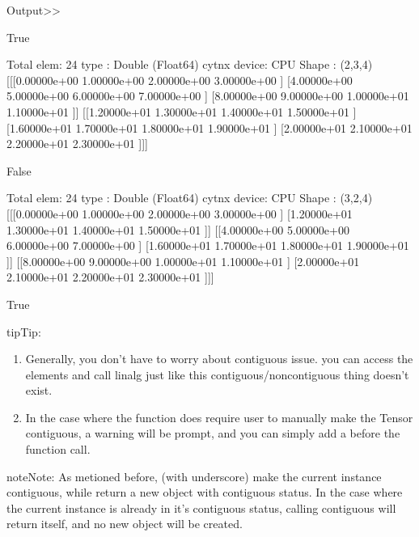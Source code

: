 \documentclass[letterpaper,10pt,english]{sphinxmanual}
\begin{document}
Output\textgreater{}\textgreater{}

\begin{sphinxVerbatim}[commandchars=\\\{\}]
True

Total elem: 24
type  : Double (Float64)
cytnx device: CPU
Shape : (2,3,4)
[[[0.00000e+00 1.00000e+00 2.00000e+00 3.00000e+00 ]
  [4.00000e+00 5.00000e+00 6.00000e+00 7.00000e+00 ]
  [8.00000e+00 9.00000e+00 1.00000e+01 1.10000e+01 ]]
 [[1.20000e+01 1.30000e+01 1.40000e+01 1.50000e+01 ]
  [1.60000e+01 1.70000e+01 1.80000e+01 1.90000e+01 ]
  [2.00000e+01 2.10000e+01 2.20000e+01 2.30000e+01 ]]]

False

Total elem: 24
type  : Double (Float64)
cytnx device: CPU
Shape : (3,2,4)
[[[0.00000e+00 1.00000e+00 2.00000e+00 3.00000e+00 ]
  [1.20000e+01 1.30000e+01 1.40000e+01 1.50000e+01 ]]
 [[4.00000e+00 5.00000e+00 6.00000e+00 7.00000e+00 ]
  [1.60000e+01 1.70000e+01 1.80000e+01 1.90000e+01 ]]
 [[8.00000e+00 9.00000e+00 1.00000e+01 1.10000e+01 ]
  [2.00000e+01 2.10000e+01 2.20000e+01 2.30000e+01 ]]]

True
\end{sphinxVerbatim}

\begin{sphinxadmonition}{tip}{Tip:}\begin{enumerate}
%
\item {} 
Generally, you don’t have to worry about contiguous issue. you can access the elements and call linalg just like this contiguous/non\sphinxhyphen{}contiguous thing doesn’t exist.

\item {} 
In the case where the function does require user to manually make the Tensor contiguous, a warning will be prompt, and you can simply add a  before the function call.

\end{enumerate}
\end{sphinxadmonition}

\begin{sphinxadmonition}{note}{Note:}
As metioned before,  (with underscore) make the current instance contiguous, while  return a new object with contiguous status.
In the case where the current instance is already in it’s contiguous status, calling contiguous will return itself, and no new object will be created.
\end{sphinxadmonition}
\end{document}
